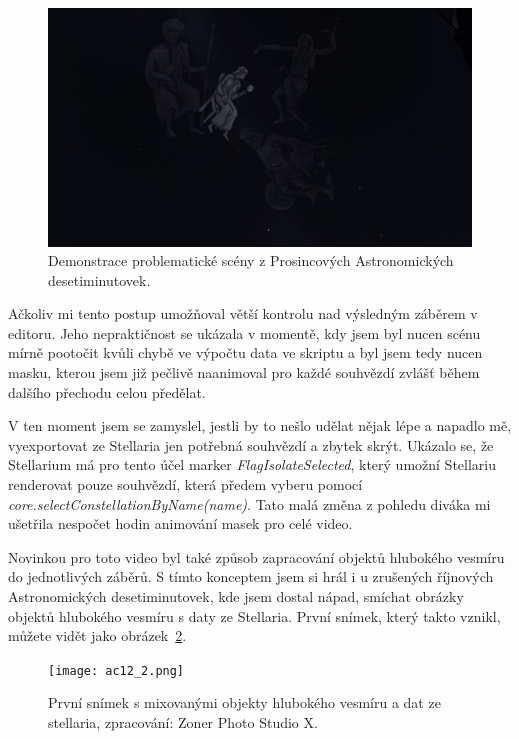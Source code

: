 \documentclass[12pt,a4paper,titlepage]{article}
\begin{document}
\begin{figure}[h]
	\centering
	\includegraphics[width=.95\textwidth]{ac12_1.png}
	\caption{Demonstrace problematické scény z Prosincových Astronomických desetiminutovek.}\label{prac:ac12_1}
\end{figure}

Ačkoliv mi tento postup umožňoval větší kontrolu nad výsledným záběrem v editoru. Jeho nepraktičnost se ukázala v momentě, kdy jsem byl nucen scénu mírně pootočit kvůli chybě ve výpočtu data ve skriptu a byl jsem tedy nucen masku, kterou jsem již pečlivě naanimoval pro každé souhvězdí zvlášť během dalšího přechodu celou předělat.

V ten moment jsem se zamyslel, jestli by to nešlo udělat nějak lépe a napadlo mě, vyexportovat ze Stellaria jen potřebná souhvězdí a zbytek skrýt. Ukázalo se, že Stellarium má pro tento účel marker \textit{FlagIsolateSelected}, který umožní Stellariu renderovat pouze souhvězdí, která předem vyberu pomocí \textit{core.\-select\-Constellation\-By\-Name(name)}. Tato malá změna z pohledu diváka mi ušetřila nespočet hodin animování masek pro celé video. %

Novinkou pro toto video byl také způsob zapracování objektů hlubokého vesmíru do jednotlivých záběrů. S tímto konceptem jsem si hrál i u zrušených říjnových Astronomických desetiminutovek, kde jsem dostal nápad, smíchat obrázky objektů hlubokého vesmíru s daty ze Stellaria. První snímek, který takto vznikl, můžete vidět jako obrázek~\ref{prac:ac12_2}. 

\begin{figure}[h]
	\centering
	\texttt{[image: ac12\_2.png]}
	\caption{První snímek s mixovanými objekty hlubokého vesmíru a dat ze stellaria, zpracování: Zoner Photo Studio X.}\label{prac:ac12_2}
\end{figure}
\end{document}
